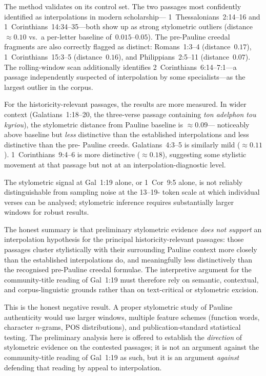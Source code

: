 \documentclass[12pt,oneside]{article}
\newcommand{\grk}[1]{\textit{#1}}   %
\begin{document}
The method validates on its control set.  The two passages most
confidently identified as interpolations in modern scholarship---
1~Thessalonians~2:14--16 and 1~Corinthians~14:34--35---both show up
as strong stylometric outliers (distance~$\approx 0.10$ vs.\ a
per-letter baseline of~$0.015$--$0.05$).  The pre-Pauline creedal
fragments are also correctly flagged as distinct: Romans~1:3--4
(distance~$0.17$), 1~Corinthians~15:3--5 (distance~$0.16$), and
Philippians~2:5--11 (distance~$0.07$).  The rolling-window scan
additionally identifies 2~Corinthians~6:14--7:1---a passage
independently suspected of interpolation by some specialists---as
the largest outlier in the corpus.

For the historicity-relevant passages, the results are more
measured.  In wider context (Galatians~1:18--20, the three-verse
passage containing \grk{ton adelphon tou kyriou}), the
stylometric distance from Pauline baseline is $\approx 0.09$---
noticeably above baseline but \textit{less} distinctive than the
established interpolations and less distinctive than the pre-
Pauline creeds.  Galatians~4:3--5 is similarly mild
($\approx 0.11$).  1~Corinthians~9:4--6 is more distinctive
($\approx 0.18$), suggesting some stylistic movement at that
passage but not at an interpolation-diagnostic level.

The stylometric signal at Gal~1:19 alone, or 1~Cor~9:5 alone, is
not reliably distinguishable from sampling noise at the 13--19-
token scale at which individual verses can be analysed; stylometric
inference requires substantially larger windows for robust results.

The honest summary is that preliminary stylometric evidence
\textit{does not support} an interpolation hypothesis for the
principal historicity-relevant passages: those passages cluster
stylistically with their surrounding Pauline context more closely
than the established interpolations do, and meaningfully less
distinctively than the recognised pre-Pauline creedal formulae.
The interpretive argument for the community-title reading of
Gal~1:19 must therefore rely on semantic, contextual, and
corpus-linguistic grounds rather than on text-critical or
stylometric excision.

This is the honest negative result.  A proper stylometric study of
Pauline authenticity would use larger windows, multiple feature
schemes (function words, character $n$-grams, POS distributions),
and publication-standard statistical testing.  The preliminary
analysis here is offered to establish the \textit{direction} of
stylometric evidence on the contested passages; it is not an
argument against the community-title reading of Gal~1:19 as such,
but it is an argument \textit{against} defending that reading by
appeal to interpolation.
\end{document}
